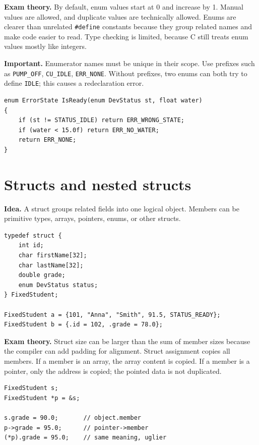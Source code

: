\documentclass[10pt,a4paper]{article}
\newcommand{\idea}{\noindent\textbf{\textcolor{accentdark}{Idea.}} }
\newcommand{\theory}{\noindent\textbf{\textcolor{accentdark}{Exam theory.}} }
\newcommand{\important}[1]{\par\smallskip\noindent\colorbox{softyellow}{\parbox{\dimexpr\linewidth-2\fboxsep}{\textbf{\textcolor{accentdark}{Important.}} #1}}\par\smallskip}
\begin{document}
\theory By default, enum values start at 0 and increase by 1. Manual values are allowed, and duplicate values are technically allowed. Enums are clearer than unrelated \texttt{\#define} constants because they group related names and make code easier to read. Type checking is limited, because C still treats enum values mostly like integers.

\important{Enumerator names must be unique in their scope. Use prefixes such as \texttt{PUMP\_OFF}, \texttt{CU\_IDLE}, \texttt{ERR\_NONE}. Without prefixes, two enums can both try to define \texttt{IDLE}; this causes a redeclaration error.}

\begin{lstlisting}[caption={Enum returned from a function}]
enum ErrorState IsReady(enum DevStatus st, float water)
{
    if (st != STATUS_IDLE) return ERR_WRONG_STATE;
    if (water < 15.0f) return ERR_NO_WATER;
    return ERR_NONE;
}
\end{lstlisting}

\section{Structs and nested structs}
\idea A struct groups related fields into one logical object. Members can be primitive types, arrays, pointers, enums, or other structs.

\begin{lstlisting}[caption={Struct declaration and initialization}]
typedef struct {
    int id;
    char firstName[32];
    char lastName[32];
    double grade;
    enum DevStatus status;
} FixedStudent;

FixedStudent a = {101, "Anna", "Smith", 91.5, STATUS_READY};
FixedStudent b = {.id = 102, .grade = 78.0};
\end{lstlisting}

\theory Struct size can be larger than the sum of member sizes because the compiler can add padding for alignment. Struct assignment copies all members. If a member is an array, the array content is copied. If a member is a pointer, only the address is copied; the pointed data is not duplicated.

\begin{lstlisting}[caption={Dot and arrow operators}]
FixedStudent s;
FixedStudent *p = &s;

s.grade = 90.0;       // object.member
p->grade = 95.0;      // pointer->member
(*p).grade = 95.0;    // same meaning, uglier
\end{lstlisting}
\end{document}
